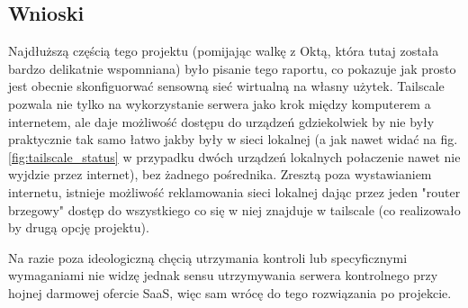 \documentclass[../main.tex]{subfiles}
\begin{document}
\subsection{Wnioski}
Najdłuższą częścią tego projektu (pomijając walkę z Oktą, która tutaj została bardzo delikatnie wspomniana) było pisanie tego raportu, co pokazuje jak prosto jest obecnie skonfiguorwać sensowną sieć wirtualną na własny użytek. Tailscale pozwala nie tylko na wykorzystanie serwera jako krok między komputerem a internetem, ale daje możliwość dostępu do urządzeń gdziekolwiek by nie były praktycznie tak samo łatwo jakby były w sieci lokalnej (a jak nawet widać na fig. \ref{fig:tailscale_status} w przypadku dwóch urządzeń lokalnych połaczenie nawet nie wyjdzie przez internet), bez żadnego pośrednika. Zresztą poza wystawianiem internetu, istnieje możliwość reklamowania sieci lokalnej dając przez jeden "router brzegowy" dostęp do wszystkiego co się w niej znajduje w tailscale (co realizowało by drugą opcję projektu).

Na razie poza ideologiczną chęcią utrzymania kontroli lub specyficznymi wymaganiami nie widzę jednak sensu utrzymywania serwera kontrolnego przy hojnej darmowej ofercie SaaS, więc sam wrócę do tego rozwiązania po projekcie.
\end{document}
